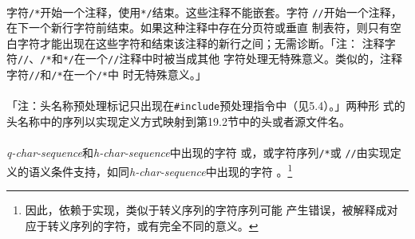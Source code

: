\paragraph{}
字符\texttt{/*}开始一个注释，使用\texttt{*/}结束。这些注释不能嵌套。字符
\texttt{//}开始一个注释，在下一个新行字符前结束。如果这种注释中存在分页符或垂直
制表符，则只有空白字符才能出现在这些字符和结束该注释的新行之间；无需诊断。「注：
注释字符\texttt{//}、\texttt{/*}和\texttt{*/}在一个\texttt{//}注释中时被当成其他
字符处理无特殊意义。类似的，注释字符\texttt{//}和\texttt{/*}在一个\texttt{/*}中
时无特殊意义。」


\paragraph{}
「注：头名称预处理标记只出现在\texttt{\#include}预处理指令中（见5.4）。」两种形
式的头名称中的序列以实现定义方式映射到第19.2节中的头或者源文件名。

\paragraph{}
\textit{q-char-sequence}和\textit{h-char-sequence}中出现的字符
\texttt{\sq}或\texttt{\dq}，或字符序列\texttt{/*}或
\texttt{//}由实现定义的语义条件支持，如同\textit{h-char-sequence}中出现的字符
\texttt{\dq}。\footnote{因此，依赖于实现，类似于转义序列的字符序列可能
产生错误，被解释成对应于转义序列的字符，或有完全不同的意义。}


